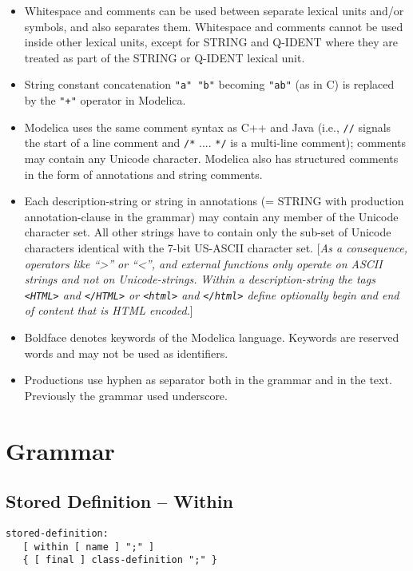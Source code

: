 \begin{itemize}
\item
  Whitespace and comments can be used between separate lexical units
  and/or symbols, and also separates them. Whitespace and comments
  cannot be used inside other lexical units, except for STRING and
  Q-IDENT where they are treated as part of the STRING or Q-IDENT
  lexical unit.
\item
  String constant concatenation \lstinline!"a" "b"! becoming \lstinline!"ab"! (as in C) is
  replaced by the \lstinline!"+"! operator in Modelica.
\item
  Modelica uses the same comment syntax as C++ and Java (i.e., \lstinline!//!
  signals the start of a line comment and \lstinline!/*! .... \lstinline!*/! is a multi-line
  comment); comments may contain any Unicode character. Modelica also
  has structured comments in the form of annotations and string
  comments.
\item
  Each description-string or string in annotations (= STRING with production annotation-clause in the
  grammar) may contain any member of the Unicode character set. All
  other strings have to contain only the sub-set of Unicode characters
  identical with the 7-bit US-ASCII character set. {[}\emph{As a
  consequence, operators like ``\textgreater{}'' or ``\textless{}'', and
  external functions only operate on ASCII strings and not on
  Unicode-strings.} \emph{Within a description-string the tags
  \lstinline!<HTML>! and \lstinline!</HTML>! or
  \lstinline!<html>! and \lstinline!</html>!
  define optionally begin and end of content that is HTML encoded.}{]}
\item
  Boldface denotes keywords of the Modelica language. Keywords are
  reserved words and may not be used as identifiers.
\item
  Productions use hyphen as separator both in the grammar and in the
  text. Previously the grammar used underscore.
\end{itemize}

\section{Grammar}
\subsection{Stored Definition -- Within}
\begin{lstlisting}[language=grammar]
stored-definition:
   [ within [ name ] ";" ]
   { [ final ] class-definition ";" }
\end{lstlisting}

